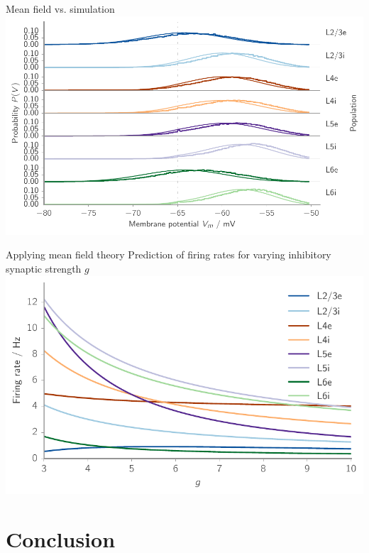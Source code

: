\documentclass[xcolor=x11names,compress]{beamer}
\renewcommand{\(}{\begin{columns}}
\renewcommand{\)}{\end{columns}}
\newcommand{\<}[1]{\begin{column}{#1}}
\renewcommand{\>}{\end{column}}
\begin{document}
\begin{frame}[t]{Mean field vs. simulation}
    \center
    \includegraphics[height=0.8\textheight]{../figures/membrane_potential}
\end{frame}

\begin{frame}[t]{Applying mean field theory}
    Prediction of firing rates for varying inhibitory synaptic strength $g$
    \center
    \includegraphics[height=0.7\textheight]{../figures/simulate_change_g}
\end{frame}

\section{Conclusion}
\label{sec:conclusion}
\end{document}
